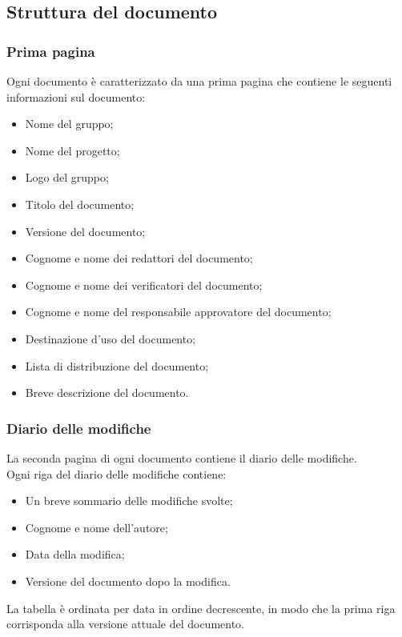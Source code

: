     \subsection{Struttura del documento}
      \subsubsection{Prima pagina}
        Ogni documento è caratterizzato da una prima pagina che contiene le seguenti informazioni sul documento:\\
        \begin{itemize}
          \item Nome del gruppo;
          \item Nome del progetto;
          \item Logo del gruppo;
          \item Titolo del documento;
          \item Versione del documento;
          \item Cognome e nome dei redattori del documento;
          \item Cognome e nome dei verificatori del documento;
          \item Cognome e nome del responsabile approvatore del documento;
          \item Destinazione d’uso del documento;
          \item Lista di distribuzione del documento;
          \item Breve descrizione del documento.
        \end{itemize}
      \subsubsection{Diario delle modifiche}
        La seconda pagina di ogni documento contiene il diario delle modifiche.\\
        Ogni riga del diario delle modifiche contiene:
        \begin{itemize}
          \item Un breve sommario delle modifiche svolte;
          \item Cognome e nome dell’autore;
          \item Data della modifica;
          \item Versione del documento dopo la modifica.
        \end{itemize}
        La tabella è ordinata per data in ordine decrescente, in modo che la prima riga corrisponda alla versione attuale del documento.

